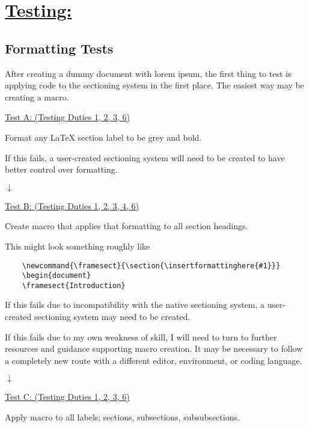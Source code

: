 \documentclass[12pt]{article}
\begin{document}
\vspace{1em}
\section*{\underline{\Large{\textbf{Testing:}}}}

\subsection*{Formatting Tests}

After creating a dummy document with lorem ipsum, the first thing to test is applying code to the sectioning system in the first place. The easiest way may be creating a macro. 

\vspace{0.5em}
\underline{Test A: (Testing Duties 1, 2, 3, 6)}

Format any LaTeX section label to be grey and bold.

If this fails, a user-created sectioning system will need to be created to have better control over formatting.

$\downarrow$

\underline{Test B: (Testing Duties 1, 2, 3, 4, 6)}

Create macro that applies that formatting to all section headings.

This might look something roughly like 
\begin{verbatim}
    \newcommand{\framesect}{\section{\insertformattinghere{#1}}}
    \begin{document}
    \framesect{Introduction}
\end{verbatim}

If this fails due to incompatibility with the native sectioning system, a user-created sectioning system may need to be created.

If this fails due to my own weakness of skill, I will need to turn to further resources and guidance supporting macro creation. It may be necessary to follow a completely new route with a different editor, environment, or coding language.

$\downarrow$

\underline{Test C: (Testing Duties 1, 2, 3, 6)}

Apply macro to all labels; sections, subsections, subsubsections.
\end{document}
